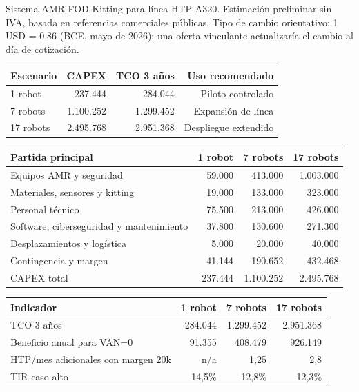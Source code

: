 \begin{tcolorbox}[
  enhanced,
  breakable,
  colback=UniLight,
  colframe=UniPrimaryDeep,
  colbacktitle=UniPrimaryDeep,
  coltitle=white,
  title={Diapositiva extra: Presupuesto detallado},
  fonttitle=\bfseries,
  arc=1.5mm,
  boxrule=0.8pt
]
Sistema AMR-FOD-Kitting para línea HTP A320. Estimación preliminar sin IVA, basada en referencias comerciales públicas. Tipo de cambio orientativo: 1 USD = 0,86 \texteuro{} (BCE, mayo de 2026); una oferta vinculante actualizaría el cambio al día de cotización.

\begin{tabularx}{\textwidth}{Y r r r}
\toprule
Escenario & CAPEX & TCO 3 años & Uso recomendado\\
 robot & 237.444 \texteuro{} & 284.044 \texteuro{} & Piloto controlado\\
7 robots & 1.100.252 \texteuro{} & 1.299.452 \texteuro{} & Expansión de línea\\
17 robots & 2.495.768 \texteuro{} & 2.951.368 \texteuro{} & Despliegue extendido\\
\bottomrule
\end{tabularx}

\vspace{0.4em}
\scriptsize
\begin{tabularx}{\textwidth}{Y r r r}
\toprule
Partida principal & 1 robot & 7 robots & 17 robots\\
\midrule
Equipos AMR y seguridad & 59.000 & 413.000 & 1.003.000\\
Materiales, sensores y kitting & 19.000 & 133.000 & 323.000\\
Personal técnico & 75.500 & 213.000 & 426.000\\
Software, ciberseguridad y mantenimiento & 37.800 & 130.600 & 271.300\\
Desplazamientos y logística & 5.000 & 20.000 & 40.000\\
Contingencia y margen & 41.144 & 190.652 & 432.468\\
\midrule
CAPEX total & 237.444 & 1.100.252 & 2.495.768\\
\bottomrule
\end{tabularx}
\normalsize

\vspace{0.4em}
\scriptsize
\begin{tabularx}{\textwidth}{Y r r r}
\toprule
Indicador & 1 robot & 7 robots & 17 robots\\
\midrule
TCO 3 años & 284.044 & 1.299.452 & 2.951.368\\
Beneficio anual para VAN=0 & 91.355 & 408.479 & 926.149\\
HTP/mes adicionales con margen 20k & n/a & 1,25 & 2,8\\
TIR caso alto & 14,5\% & 12,8\% & 12,3\%\\
\bottomrule
\end{tabularx}
\normalsize


\end{tcolorbox}
